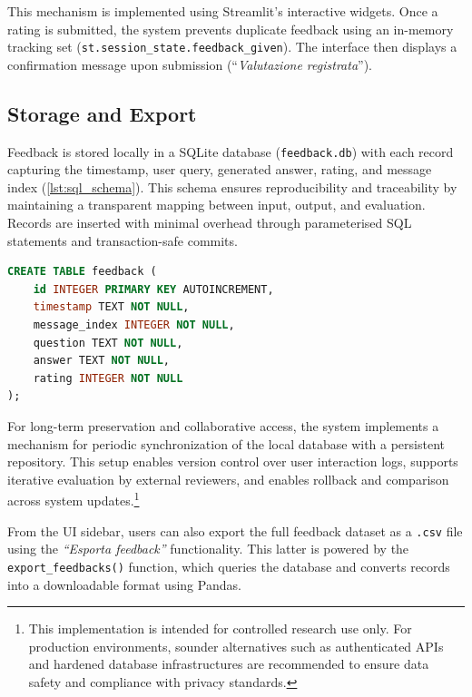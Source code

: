 \begin{spacing}{1.5}
This mechanism is implemented using Streamlit’s interactive widgets. Once a rating is submitted, the system prevents duplicate feedback using an in-memory tracking set (\texttt{st.session\_state.feedback\_given}). The interface then displays a confirmation message upon submission (``\textit{Valutazione registrata}'').

\subsection{Storage and Export}
Feedback is stored locally in a SQLite database (\texttt{feedback.db}) with each record capturing the timestamp, user query, generated answer, rating, and message index (\autoref{lst:sql_schema}). This schema ensures reproducibility and traceability by maintaining a transparent mapping between input, output, and evaluation. Records are inserted with minimal overhead through parameterised SQL statements and transaction-safe commits.

\vspace{0.5em}
\begin{lstlisting}[language=SQL,
                  frame=none,
                   caption={SQL schema of the feedback database.},
                   captionpos=b,
                   label={lst:sql_schema},
  xleftmargin=0.2\textwidth,
  xrightmargin=0.1\textwidth]
CREATE TABLE feedback (
    id INTEGER PRIMARY KEY AUTOINCREMENT,
    timestamp TEXT NOT NULL,
    message_index INTEGER NOT NULL,
    question TEXT NOT NULL,
    answer TEXT NOT NULL,
    rating INTEGER NOT NULL
);
\end{lstlisting}

For long-term preservation and collaborative access, the system implements a mechanism for periodic synchronization of the local database with a persistent repository. This setup enables version control over user interaction logs, supports iterative evaluation by external reviewers, and enables rollback and comparison across system updates.\footnote{This implementation is intended for controlled research use only. For production environments, sounder alternatives such as authenticated APIs and hardened database infrastructures are recommended to ensure data safety and compliance with privacy standards.}

From the UI sidebar, users can also export the full feedback dataset as a \texttt{.csv} file using the \textit{``Esporta feedback''} functionality. This latter is powered by the \texttt{export\_feedbacks()} function, which queries the database and converts records into a downloadable format using Pandas. 


\end{spacing}
